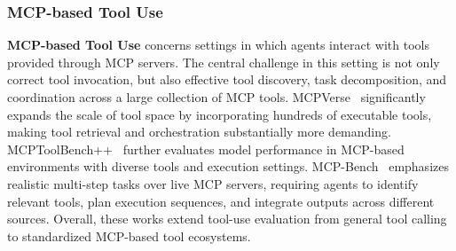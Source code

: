 \subsubsection{MCP-based Tool Use}
\label{MCP-based Tool Use}
\textbf{MCP-based Tool Use} concerns settings in which agents interact with tools provided through MCP servers. The central challenge in this setting is not only correct tool invocation, but also effective tool discovery, task decomposition, and coordination across a large collection of MCP tools. MCPVerse~\cite{MCPVerse} significantly expands the scale of tool space by incorporating hundreds of executable tools, making tool retrieval and orchestration substantially more demanding. MCPToolBench++~\cite{MCPToolBench++} further evaluates model performance in MCP-based environments with diverse tools and execution settings. MCP-Bench~\cite{MCP-Bench} emphasizes realistic multi-step tasks over live MCP servers, requiring agents to identify relevant tools, plan execution sequences, and integrate outputs across different sources. Overall, these works extend tool-use evaluation from general tool calling to standardized MCP-based tool ecosystems.


